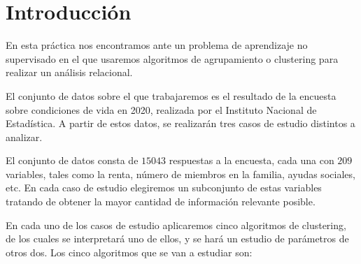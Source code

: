 
\chapter{Introducción}


En esta práctica nos encontramos ante un problema de aprendizaje no supervisado en el que usaremos algoritmos de agrupamiento o clustering para realizar un análisis relacional.

El conjunto de datos sobre el que trabajaremos es el resultado de la encuesta sobre condiciones de vida en 2020, realizada por el Instituto Nacional de Estadística. A partir de estos datos, se realizarán tres casos de estudio distintos a analizar.

El conjunto de datos consta de $15043$ respuestas a la encuesta, cada una con $209$ variables, tales como la renta, número de miembros en la familia, ayudas sociales, etc. En cada caso de estudio elegiremos un subconjunto de estas variables tratando de obtener la mayor cantidad de información relevante posible.

En cada uno de los casos de estudio aplicaremos cinco algoritmos de clustering, de los cuales se interpretará uno de ellos, y se hará un estudio de parámetros de otros dos. Los cinco algoritmos que se van a estudiar son:

